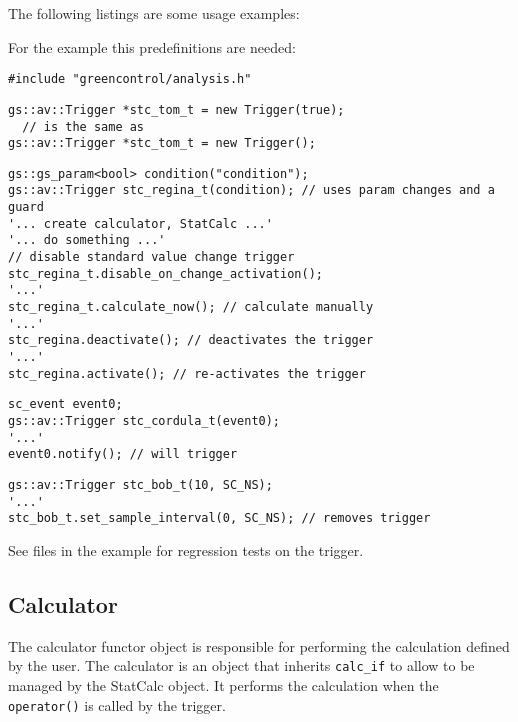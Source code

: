 The following listings are some usage examples:

For the example this predefinitions are needed:
\begin{lstlisting}
#include "greencontrol/analysis.h"
\end{lstlisting}

\vspace{.5cm}

\begin{lstlisting}[caption={Example: standard value change trigger.}]
gs::av::Trigger *stc_tom_t = new Trigger(true);
  // is the same as 
gs::av::Trigger *stc_tom_t = new Trigger();
\end{lstlisting}

\begin{lstlisting}[caption={Example: standard value change trigger with condition guard.}]
gs::gs_param<bool> condition("condition");
gs::av::Trigger stc_regina_t(condition); // uses param changes and a guard
'... create calculator, StatCalc ...'
'... do something ...'
// disable standard value change trigger
stc_regina_t.disable_on_change_activation();
'...'
stc_regina_t.calculate_now(); // calculate manually
'...'
stc_regina.deactivate(); // deactivates the trigger
'...'
stc_regina.activate(); // re-activates the trigger
\end{lstlisting}

\begin{lstlisting}[caption={Example: SystemC event trigger.}]
sc_event event0;
gs::av::Trigger stc_cordula_t(event0);
'...'
event0.notify(); // will trigger
\end{lstlisting}

\begin{lstlisting}[caption={Example: periodical sample interval trigger.}]
gs::av::Trigger stc_bob_t(10, SC_NS);
'...'
stc_bob_t.set_sample_interval(0, SC_NS); // removes trigger
\end{lstlisting}

See files  in the example  for regression tests on the trigger.




\subsection{Calculator}
\label{GAVCalculator}


The calculator functor object is responsible for performing the calculation defined by the user.
The calculator is an object that inherits \lstinline|calc_if| to allow to be managed by the StatCalc object. It performs the calculation when the \lstinline[language=TeX]|operator()| is called by the trigger.

